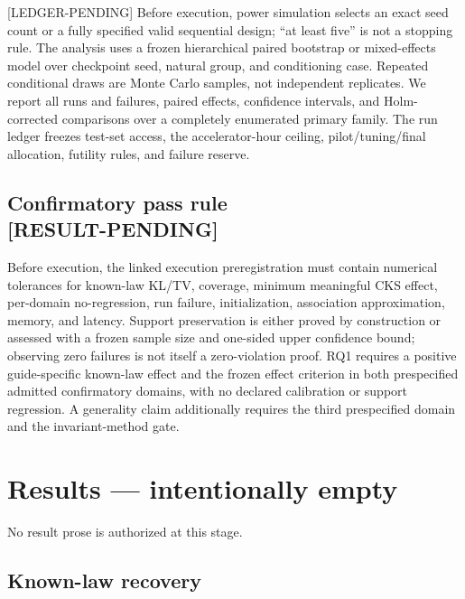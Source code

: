 \documentclass[11pt]{article}
\newcommand{\status}[1]{%
  \textcolor{statusred}{\textbf{\texttt{[#1]}}}%
}
\newcommand{\supportingfile}[2]{%
  \emph{#1} (\nolinkurl{#2})%
}
\def\status#1{[#1]}%
\def\supportingfile#1#2{#1}%
\begin{document}
\status{LEDGER-PENDING} Before execution, power simulation selects an exact seed count or a fully specified valid sequential design; ``at least five'' is not a stopping rule. The analysis uses a frozen hierarchical paired bootstrap or mixed-effects model over checkpoint seed, natural group, and conditioning case. Repeated conditional draws are Monte Carlo samples, not independent replicates. We report all runs and failures, paired effects, confidence intervals, and Holm-corrected comparisons over a completely enumerated primary family. The run ledger freezes test-set access, the accelerator-hour ceiling, pilot/\allowbreak{}tuning/\allowbreak{}final allocation, futility rules, and failure reserve.

\subsection[Confirmatory pass rule]{Confirmatory pass rule\\[-0.15em]{\protect\small\status{RESULT-PENDING}}}
\label{sec:confirmatory-pass-rule-result-pending}

Before execution, the linked \supportingfile{execution preregistration}{execution_preregistration.md} must contain numerical tolerances for known-law KL/\allowbreak{}TV, coverage, minimum meaningful CKS effect, per-domain no-regression, run failure, initialization, association approximation, memory, and latency. Support preservation is either proved by construction or assessed with a frozen sample size and one-sided upper confidence bound; observing zero failures is not itself a zero-violation proof. RQ1 requires a positive guide-specific known-law effect and the frozen effect criterion in both prespecified admitted confirmatory domains, with no declared calibration or support regression. A generality claim additionally requires the third prespecified domain and the invariant-method gate.

\section{Results --- intentionally empty}
\label{sec:results-intentionally-empty}

No result prose is authorized at this stage.

\subsection{Known-law recovery}
\label{sec:known-law-recovery}
\end{document}

